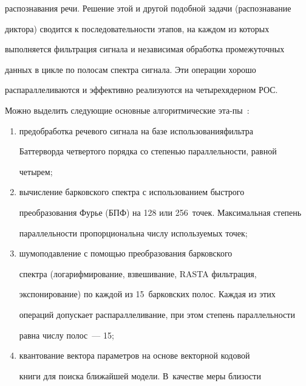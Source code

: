 распознавания речи. Решение этой и другой подобной задачи (распознавание 


диктора) сводится к последовательности этапов, на каждом из которых 


выполняется фильтрация сигнала и независимая обработка промежуточных 


данных в цикле по полосам спектра сигнала. Эти операции хорошо 


распараллеливаются и эффективно реализуются на четырехядерном РОС.


      


      Можно выделить следующие основные алгоритмические эта-\linebreak пы~\cite{2-3}:


      \begin{enumerate}[(1)]


      \item предобработка речевого сигнала на базе использования\linebreak фильтра 


Баттерворда четвертого порядка со степенью параллельности, равной 


четырем;


\pagebreak


      \item вычисление барковского спект\-ра с использованием быст\-ро\-го 


преобразования Фурье (БПФ) на 128 или 256~точек. Максимальная степень 


параллельности пропорциональна числу используемых точек;




      \item шумоподавление с помощью преобразования барковского\linebreak 


спект\-ра (логарифмирование, взвешивание, RASTA фильт\-ра\-ция, 


экспонирование) по каждой из 15~барковских полос. Каждая из этих 


операций допускает распараллеливание, при этом степень параллельности 


равна числу полос~--- 15;


      \item квантование вектора параметров на основе векторной кодовой 


книги для поиска ближайшей модели. В~качестве меры близости 



\end{enumerate}
